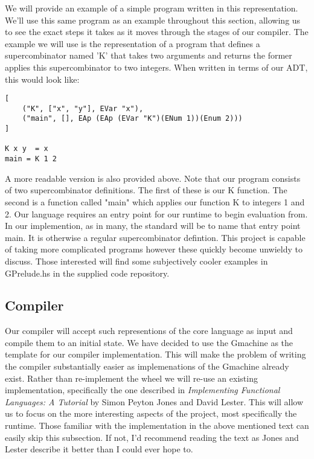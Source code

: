 We will provide an example of a simple program written in this
representation. We'll use this same program as an example 
throughout this section, allowing us to see the exact steps it
takes as it moves through the stages of our compiler. The 
example we will use is the representation of a program that 
defines a supercombinator named 'K' that takes two arguments 
and returns the former applies this supercombinator to two 
integers. When written in terms of our ADT, this would look
like:

\begin{verbatim}
[
	("K", ["x", "y"], EVar "x"), 
 	("main", [], EAp (EAp (EVar "K")(ENum 1))(Enum 2)))
]

K x y  = x
main = K 1 2
\end{verbatim}

A more readable version is also provided above. Note that our
program consists of two supercombinator definitions. The first
of these is our K function. The second is a function called
"main" which applies our function K to integers 1 and 2. Our
language requires an entry point for our runtime to begin
evaluation from. In our implemention, as in many, the standard
will be to name that entry point main. It is otherwise a 
regular supercombinator defintion. This project is capable of
taking more complicated programs however these quickly become
unwieldy to discuss. Those interested will find some subjectively
cooler examples in GPrelude.hs in the supplied code repository.

\subsection{Compiler}
Our compiler will accept such representions of the core language
as input and compile them to an initial state. We have
decided to use the Gmachine as the template for our compiler
implementation. This will make the problem of writing the compiler
substantially easier as implemenations of the Gmachine already
exist. Rather than re-implement the wheel we will re-use an 
existing implementation, specifically the one described in 
\emph{Implementing Functional Languages: A Tutorial} by Simon
Peyton Jones and David Lester. This will allow us to focus on
the more interesting aspects of the project, most specifically
the runtime. Those familiar with the implementation in the 
above mentioned text can easily skip this subsection. If not, 
I'd recommend reading the text as Jones and Lester 
describe it better than I could ever hope to.

